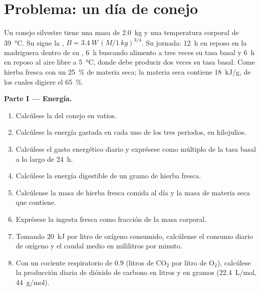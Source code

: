 \section{Problema: un día de conejo}

\begin{problem}
\label{pb:b1:mammal-organization:1}
Un conejo silvestre tiene una masa de \qty{2.0}{kg} y una temperatura
corporal de \qty{39}{\celsius}. Su  sigue la , $B = \qty{3.4}{W}\,(M/\qty{1}{kg})^{3/4}$. Su jornada: \qty{12}{h}
en reposo en la madriguera dentro de su ,
\qty{6}{h} buscando alimento a tres veces su tasa basal y \qty{6}{h} en
reposo al aire libre a \qty{5}{\celsius}, donde debe producir dos veces su
tasa basal. Come hierba fresca con un \qty{25}{\%} de materia seca; la
materia seca contiene \qty{18}{kJ/g}, de los cuales digiere el \qty{65}{\%}.

\medskip
\noindent\textbf{Parte I --- Energía.}
\begin{enumerate}
  \item Calcúlese la  del conejo en vatios.
  \item Calcúlese la energía gastada en cada uno de los tres periodos, en
        kilojulios.
  \item Calcúlese el gasto energético diario y exprésese como múltiplo de
        la tasa basal a lo largo de \qty{24}{h}.
  \item Calcúlese la energía digestible de un gramo de hierba fresca.
  \item Calcúlense la masa de hierba fresca comida al día y la masa de
        materia seca que contiene.
  \item Exprésese la ingesta fresca como fracción de la masa corporal.
  \item Tomando \qty{20}{kJ} por litro de oxígeno consumido, calcúlense el
        consumo diario de oxígeno y el caudal medio en mililitros por
        minuto.
  \item Con un cociente respiratorio de $0.9$ (litros de $\mathrm{CO_2}$
        por litro de $\mathrm{O_2}$), calcúlese la producción diaria de
        dióxido de carbono en litros y en gramos (\qty{22.4}{L/mol},
        \qty{44}{g/mol}).
\end{enumerate}


\end{problem}
